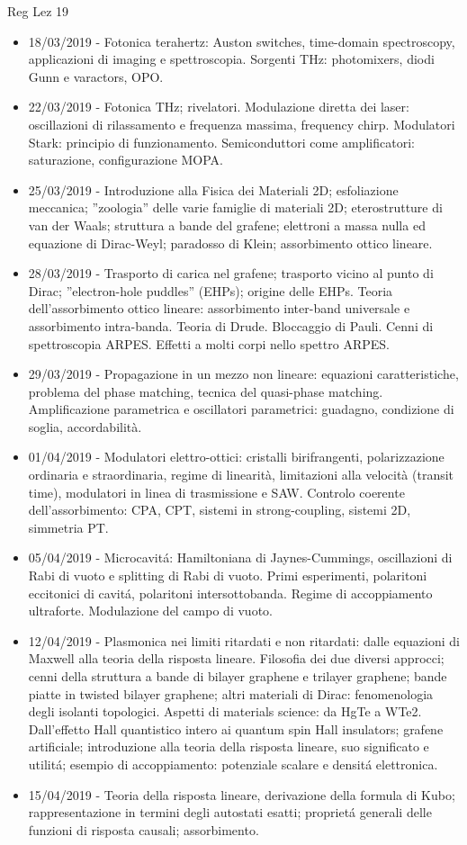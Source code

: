 \begin{frame}[allowframebreaks]{Reg Lez 19}
\begin{itemize}
\item 18/03/2019 - Fotonica terahertz: Auston switches, time-domain spectroscopy, applicazioni di imaging e spettroscopia. Sorgenti THz: photomixers, diodi Gunn e varactors, OPO.
\item 22/03/2019 - Fotonica THz; rivelatori. Modulazione diretta dei laser: oscillazioni di rilassamento e frequenza massima, frequency chirp. Modulatori Stark: principio di funzionamento. Semiconduttori come amplificatori: saturazione, configurazione MOPA.
\item 25/03/2019 - Introduzione alla Fisica dei Materiali 2D; esfoliazione meccanica; ''zoologia'' delle varie famiglie di materiali 2D; eterostrutture di van der Waals; struttura a bande del grafene; elettroni a massa nulla ed equazione di Dirac-Weyl; paradosso di Klein; assorbimento ottico lineare.
\item 28/03/2019 - Trasporto di carica nel grafene; trasporto vicino al punto di Dirac; ''electron-hole puddles'' (EHPs); origine delle EHPs. Teoria dell'assorbimento ottico lineare: assorbimento inter-band universale e assorbimento intra-banda. Teoria di Drude. Bloccaggio di Pauli. Cenni di spettroscopia ARPES. Effetti a molti corpi nello spettro ARPES.
\item 29/03/2019 - Propagazione in un mezzo non lineare: equazioni caratteristiche, problema del phase matching, tecnica del quasi-phase matching. Amplificazione parametrica e oscillatori parametrici: guadagno, condizione di soglia, accordabilità.
\item 01/04/2019 - Modulatori elettro-ottici: cristalli birifrangenti, polarizzazione ordinaria e straordinaria, regime di linearità, limitazioni alla velocità (transit time), modulatori in linea di trasmissione e SAW. Controlo coerente dell'assorbimento: CPA, CPT, sistemi in strong-coupling, sistemi 2D, simmetria PT.
\item 05/04/2019 - Microcavit\'a: Hamiltoniana di Jaynes-Cummings, oscillazioni di Rabi di vuoto e splitting di Rabi di vuoto. Primi esperimenti, polaritoni eccitonici di cavit\'a, polaritoni intersottobanda. Regime di accoppiamento ultraforte. Modulazione del campo di vuoto.
\item 12/04/2019 - Plasmonica nei limiti ritardati e non ritardati: dalle equazioni di Maxwell alla teoria della risposta lineare. Filosofia dei due diversi approcci; cenni della struttura a bande di bilayer graphene e trilayer graphene; bande piatte in twisted bilayer graphene; altri materiali di Dirac: fenomenologia degli isolanti topologici. Aspetti di materials science: da HgTe a WTe2. Dall'effetto Hall quantistico intero ai quantum spin Hall insulators; grafene artificiale; introduzione alla teoria della risposta lineare, suo significato e utilit\'a; esempio di accoppiamento: potenziale scalare e densit\'a elettronica. 
\item 15/04/2019 - Teoria della risposta lineare, derivazione della formula di Kubo; rappresentazione in termini degli autostati esatti; propriet\'a generali delle funzioni di risposta causali; assorbimento.
\end{itemize}
\end{frame}